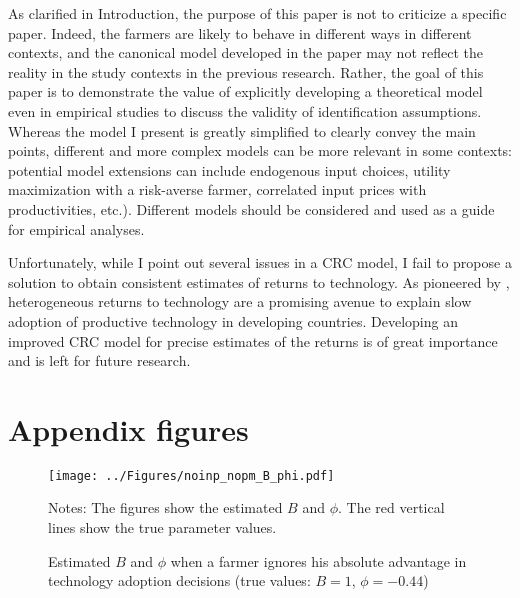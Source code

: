 \documentclass[11pt,letterpaper]{article}
\begin{document}
As clarified in Introduction, the purpose of this paper is not to criticize a specific paper.
Indeed, the farmers are likely to behave in different ways in different contexts, and the canonical model developed in the paper may not reflect the reality in the study contexts in the previous research.
Rather, the goal of this paper is to demonstrate the value of explicitly developing a theoretical model even in empirical studies to discuss the validity of identification assumptions.
Whereas the model I present is greatly simplified to clearly convey the main points, different and more complex models can be more relevant in some contexts: potential model extensions can include endogenous input choices, utility maximization with a risk-averse farmer, correlated input prices with productivities, etc.).
Different models should be considered and used as a guide for empirical analyses.

Unfortunately, while I point out several issues in a CRC model, I fail to propose a solution to obtain consistent estimates of returns to technology.
As pioneered by \citet{Suri11}, heterogeneous returns to technology are a promising avenue to explain slow adoption of productive technology in developing countries.
Developing an improved CRC model for precise estimates of the returns is of great importance and is left for future research.

\clearpage



\appendix

  

\setcounter{figure}{0}
\setcounter{table}{0}
\renewcommand\thefigure{\Alph{section}.\arabic{figure}}
\renewcommand\thetable{\Alph{section}.\arabic{table}}
  
\section{Appendix figures}\label{sec:appendix_figure}

\begin{figure}[H]
  \centering
  \caption{Estimated $B$ and $\phi$ when a farmer ignores his absolute advantage in technology adoption decisions (true values: $B = 1$, $\phi = -0.44$)}
  \texttt{[image: ../Figures/noinp\_nopm\_B\_phi.pdf]}
  \label{fig:noinp_nopm_B_phi}
  \footnotesize
  \begin{tablenotes}
    \item Notes:
      The figures show the estimated $B$ and $\phi$.
      The red vertical lines show the true parameter values.
  \end{tablenotes}
\end{figure}
\end{document}
